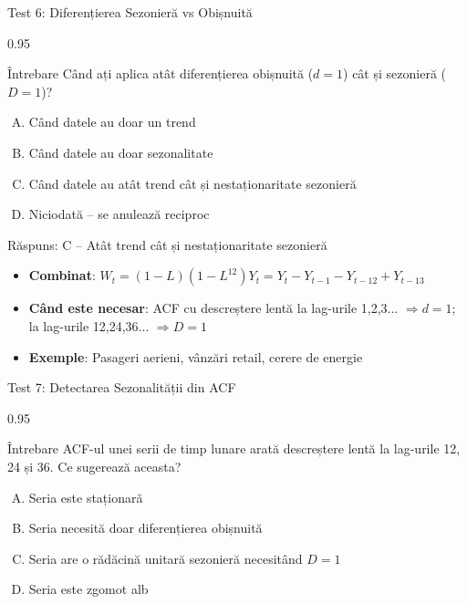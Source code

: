\documentclass[9pt, aspectratio=169, t]{beamer}
\begin{document}
\begin{frame}{Test 6: Diferențierea Sezonieră vs Obișnuită}
    \begin{cminipage}{0.95\textwidth}
    \begin{alertblock}{Întrebare}
        Când ați aplica atât diferențierea obișnuită ($d=1$) cât și sezonieră ($D=1$)?
    \end{alertblock}

    \vspace{0.3cm}

    \begin{enumerate}[A)]\setlength{\itemsep}{0pt}
        \item Când datele au doar un trend
        \item Când datele au doar sezonalitate
        \item Când datele au atât trend cât și nestaționaritate sezonieră
        \item Niciodată -- se anulează reciproc
    \end{enumerate}

    \vspace{0.5cm}
    \pause
    \begin{exampleblock}{Răspuns: C -- Atât trend cât și nestaționaritate sezonieră}
        {\small
        \begin{itemize}\setlength{\itemsep}{0pt}
        \item \textbf{Combinat}: $W_t = (1-L)(1-L^{12})Y_t = Y_t - Y_{t-1} - Y_{t-12} + Y_{t-13}$
        \item \textbf{Când este necesar}: ACF cu descreștere lentă la lag-urile 1,2,3... $\Rightarrow d=1$; la lag-urile 12,24,36... $\Rightarrow D=1$
        \item \textbf{Exemple}: Pasageri aerieni, vânzări retail, cerere de energie
        \end{itemize}
        }
    \end{exampleblock}
    \end{cminipage}
\end{frame}

\begin{frame}{Test 7: Detectarea Sezonalității din ACF}
    \begin{cminipage}{0.95\textwidth}
    \begin{alertblock}{Întrebare}
        ACF-ul unei serii de timp lunare arată descreștere lentă la lag-urile 12, 24 și 36. Ce sugerează aceasta?
    \end{alertblock}

    \vspace{0.3cm}

    \begin{enumerate}[A)]\setlength{\itemsep}{0pt}
        \item Seria este staționară
        \item Seria necesită doar diferențierea obișnuită
        \item Seria are o rădăcină unitară sezonieră necesitând $D=1$
        \item Seria este zgomot alb
    \end{enumerate}
    \end{cminipage}
\end{frame}
\end{document}
